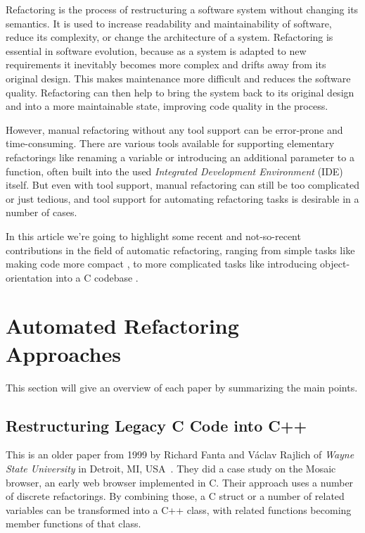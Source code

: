 \documentclass[conference,compsoc,a4paper]{IEEEtran}
\newcommand{\code}[1]{{\small\ttfamily #1}}
\begin{document}
Refactoring is the process of restructuring a software system without changing its semantics. It is used to increase 
readability and maintainability of software, reduce its complexity, or change the architecture of a system. Refactoring 
is essential in software evolution, because as a system is adapted to new requirements it inevitably becomes more 
complex and drifts away from its original design. This makes maintenance more difficult and reduces the software 
quality. Refactoring can then help to bring the system back to its original design and into a more maintainable state, 
improving code quality in the process.

However, manual refactoring without any tool support can be error-prone and time-consuming. There are various tools 
available for supporting elementary refactorings like renaming a variable or introducing an additional parameter to a 
function, often built into the used \emph{Integrated Development Environment} (IDE) itself. But even with tool support, 
manual refactoring can still be too complicated or just tedious, and tool support for automating refactoring tasks is 
desirable in a number of cases.

In this article we're going to highlight some recent and not-so-recent contributions in the field of automatic 
refactoring, ranging from simple tasks like making code more compact \cite{sparta}, to more complicated tasks like 
introducing object-orientation into a C codebase \cite{cpp}.


\section{Automated Refactoring Approaches}

This section will give an overview of each paper by summarizing the main points.

\subsection{Restructuring Legacy C Code into C++} \label{sec:cpp}

This is an older paper from 1999 by Richard Fanta and Václav Rajlich of \emph{Wayne State University} in Detroit, MI, 
USA~\cite{cpp}. They did a case study on the Mosaic browser, an early web browser implemented in C. Their approach uses 
a number of discrete refactorings. By combining those, a C \code{struct} or a number of related variables can be 
transformed into a C++ class, with related functions becoming member functions of that class.
\end{document}
